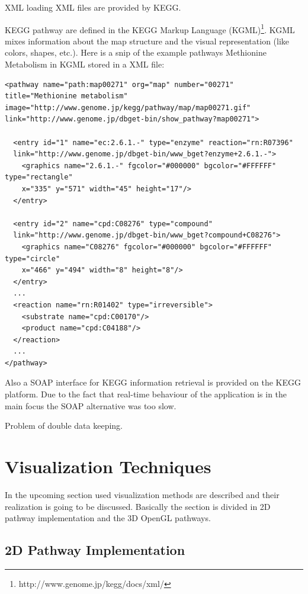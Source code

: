 XML loading
XML files are provided by KEGG.

KEGG pathway are defined in the KEGG Markup Language (KGML)\footnote{http://www.genome.jp/kegg/docs/xml/}.
KGML mixes information about the map structure and the visual representation (like colors, shapes, etc.).
Here is a snip of the example pathways Methionine Metabolism in KGML stored in a XML file:

\begin{verbatim}
<pathway name="path:map00271" org="map" number="00271" 
title="Methionine metabolism" 
image="http://www.genome.jp/kegg/pathway/map/map00271.gif" 
link="http://www.genome.jp/dbget-bin/show_pathway?map00271">

  <entry id="1" name="ec:2.6.1.-" type="enzyme" reaction="rn:R07396"
  link="http://www.genome.jp/dbget-bin/www_bget?enzyme+2.6.1.-">
    <graphics name="2.6.1.-" fgcolor="#000000" bgcolor="#FFFFFF" type="rectangle" 
    x="335" y="571" width="45" height="17"/>
  </entry>

  <entry id="2" name="cpd:C08276" type="compound" 
  link="http://www.genome.jp/dbget-bin/www_bget?compound+C08276">
    <graphics name="C08276" fgcolor="#000000" bgcolor="#FFFFFF" type="circle" 
    x="466" y="494" width="8" height="8"/>
  </entry>
  ...
  <reaction name="rn:R01402" type="irreversible">
    <substrate name="cpd:C00170"/>
    <product name="cpd:C04188"/>
  </reaction>
  ...
</pathway>
\end{verbatim}

Also a SOAP interface for KEGG information retrieval is provided on the KEGG platform. Due to the fact that real-time behaviour of the application is in the main focus the SOAP alternative was too slow.

Problem of double data keeping. 

\section{Visualization Techniques}

In the upcoming section used visualization methods are described and their realization is going to be discussed. Basically the section is divided in 2D pathway implementation and the 3D OpenGL pathways.

\subsection{2D Pathway Implementation}

